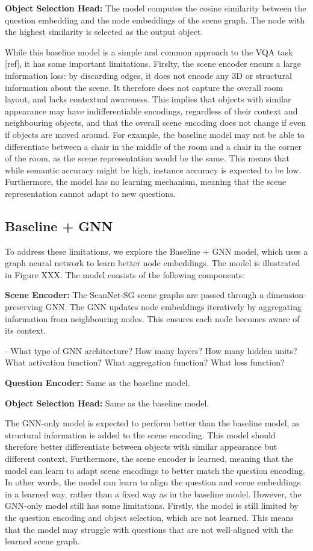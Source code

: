 \textbf{Object Selection Head:} The model computes the cosine similarity between the question embedding and the node embeddings of the scene graph. The node with the highest similarity is selected as the output object.

While this baseline model is a simple and common approach to the VQA task [ref], it has some important limitations. Firslty, the scene encoder encurs a large information loss: by discarding edges, it does not encode any 3D or structural information about the scene. It therefore does not capture the overall room layout, and lacks contextual awareness. This implies that objects with similar appearance may have indifferentiable encodings, regardless of their context and neighbouring objects, and that the overall scene encoding does not change if even if objects are moved around. For example, the baseline model may not be able to differentiate between a chair in the middle of the room and a chair in the corner of the room, as the scene representation would be the same. This means that while semantic accuracy might be high, instance accuracy is expected to be low. Furthermore, the model has no learning mechanism, meaning that the scene representation cannot adapt to new questions.

\subsection{Baseline + GNN}
To address these limitations, we explore the Baseline + GNN model, which uses a graph neural network to learn better node embeddings. The model is illustrated in Figure XXX. The model consists of the following components:

\textbf{Scene Encoder:} The ScanNet-SG scene graphs are passed through a dimension-preserving GNN. The GNN updates node embeddings iteratively by aggregating information from neighbouring nodes. This ensures each node becomes aware of its context.

- What type of GNN architecture? How many layers? How many hidden units? What activation function? What aggregation function? What loss function?

\textbf{Question Encoder:} Same as the baseline model.

\textbf{Object Selection Head:} Same as the baseline model.

The GNN-only model is expected to perform better than the baseline model, as structural information is added to the scene encoding. This model should therefore better differentiate between objects with similar appearance but different context. Furthermore, the scene encoder is learned, meaning that the model can learn to adapt scene encodings to better match the question encoding. In other words, the model can learn to align the question and scene embeddings in a learned way, rather than a fixed way as in the baseline model. However, the GNN-only model still has some limitations. Firstly, the model is still limited by the question encoding and object selection, which are not learned. This means that the model may struggle  with questions that are not well-aligned with the learned scene graph.

